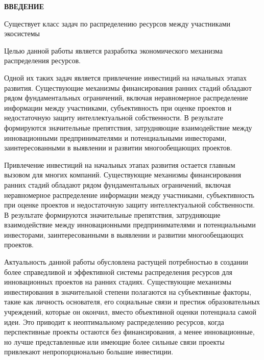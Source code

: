 \documentclass[
    14pt,
    specialist,
    candidate, %
    subf, %
    href,
    dotsinheaders=false
]{disser}
\newcommand{\myunnumberedchapter}[1]{%
  \newpage
  \hypertarget{chap:#1}{}%
  \begin{center}
    \textbf{\MakeUppercase{#1}}
  \end{center}
  \addcontentsline{toc}{chapter}{\texorpdfstring{#1}{#1}}%
}
\begin{document}
\sloppy



\renewcommand{\contentsname}{\centerline{\normalsize\bfseries\centerline{\textbf{\MakeUppercase{СОДЕРЖАНИЕ}}}}}
\setcounter{tocdepth}{1}

\tableofcontents

\myunnumberedchapter{ВВЕДЕНИЕ}

Существует класс задач по распределению ресурсов между участниками экосистемы

Целью данной работы является разработка экономического механизма распределения ресурсов.

Одной их таких задач является привлечение инвестиций на начальных этапах развития. Существующие механизмы финансирования ранних стадий обладают рядом фундаментальных ограничений, включая неравномерное распределение информации между участниками, субъективность при оценке проектов и недостаточную защиту интеллектуальной собственности. В результате формируются значительные препятствия, затрудняющие взаимодействие между инновационными предпринимателями и потенциальными инвесторами, заинтересованными в выявлении и развитии многообещающих проектов.

Привлечение инвестиций на начальных этапах развития остается главным вызовом для многих компаний. Существующие механизмы финансирования ранних стадий обладают рядом фундаментальных ограничений, включая неравномерное распределение информации между участниками, субъективность при оценке проектов и недостаточную защиту интеллектуальной собственности. В результате формируются значительные препятствия, затрудняющие взаимодействие между инновационными предпринимателями и потенциальными инвесторами, заинтересованными в выявлении и развитии многообещающих проектов.

Актуальность данной работы обусловлена растущей потребностью в создании более справедливой и эффективной системы распределения ресурсов для инновационных проектов на ранних стадиях. Существующие механизмы инвестирования в значительной степени полагаются на субъективные факторы, такие как личность основателя, его социальные связи и престиж образовательных учреждений, которые он окончил, вместо объективной оценки потенциала самой идеи. Это приводит к неоптимальному распределению ресурсов, когда перспективные проекты остаются без финансирования, а менее инновационные, но лучше представленные или имеющие более сильные связи проекты привлекают непропорционально большие инвестиции.
\end{document}
